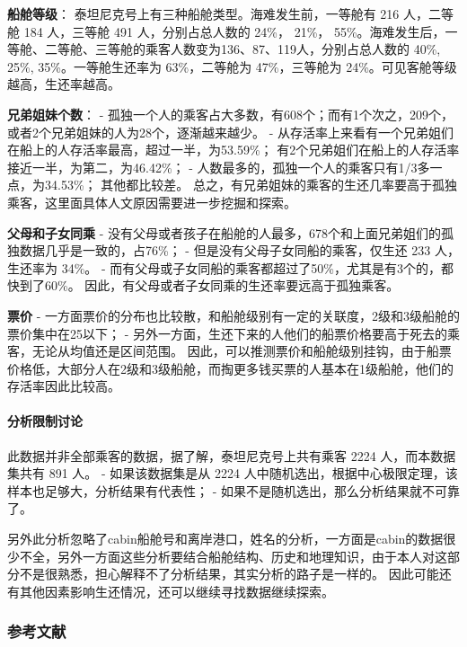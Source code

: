 \documentclass[11pt]{article}
\begin{document}
\textbf{船舱等级}： 泰坦尼克号上有三种船舱类型。海难发生前，一等舱有 216
人，二等舱 184 人，三等舱 491 人，分别占总人数的 24\%， 21\%，
55\%。海难发生后，一等舱、二等舱、三等舱的乘客人数变为136、87、119人，分别占总人数的
40\%, 25\%, 35\%。一等舱生还率为 63\%，二等舱为 47\%，三等舱为
24\%。可见客舱等级越高，生还率越高。

\textbf{兄弟姐妹个数}： -
孤独一个人的乘客占大多数，有608个；而有1个次之，209个，或者2个兄弟姐妹的人为28个，逐渐越来越少。
-
从存活率上来看有一个兄弟姐们在船上的人存活率最高，超过一半，为53.59\%；
有2个兄弟姐们在船上的人存活率接近一半，为第二，为46.42\%； -
人数最多的，孤独一个人的乘客只有1/3多一点，为34.53\%； 其他都比较差。
总之，有兄弟姐妹的乘客的生还几率要高于孤独乘客，这里面具体人文原因需要进一步挖掘和探索。

\textbf{父母和子女同乘} -
没有父母或者孩子在船舱的人最多，678个和上面兄弟姐们的孤独数据几乎是一致的，占76\%；
- 但是没有父母子女同船的乘客，仅生还 233 人，生还率为 34\%。 -
而有父母或子女同船的乘客都超过了50\%，尤其是有3个的，都快到了60\%。
因此，有父母或者子女同乘的生还率要远高于孤独乘客。

\textbf{票价} -
一方面票价的分布也比较散，和船舱级别有一定的关联度，2级和3级船舱的票价集中在25以下；
-
另外一方面，生还下来的人他们的船票价格要高于死去的乘客，无论从均值还是区间范围。
因此，可以推测票价和船舱级别挂钩，由于船票价格低，大部分人在2级和3级船舱，而掏更多钱买票的人基本在1级船舱，他们的存活率因此比较高。

\paragraph{分析限制讨论}\label{ux5206ux6790ux9650ux5236ux8ba8ux8bba}

此数据并非全部乘客的数据，据了解，泰坦尼克号上共有乘客 2224
人，而本数据集共有 891 人。 - 如果该数据集是从 2224
人中随机选出，根据中心极限定理，该样本也足够大，分析结果有代表性； -
如果不是随机选出，那么分析结果就不可靠了。

另外此分析忽略了cabin船舱号和离岸港口，姓名的分析，一方面是cabin的数据很少不全，另外一方面这些分析要结合船舱结构、历史和地理知识，由于本人对这部分不是很熟悉，担心解释不了分析结果，其实分析的路子是一样的。
因此可能还有其他因素影响生还情况，还可以继续寻找数据继续探索。

    \subsubsection{参考文献}\label{ux53c2ux8003ux6587ux732e}
\end{document}
